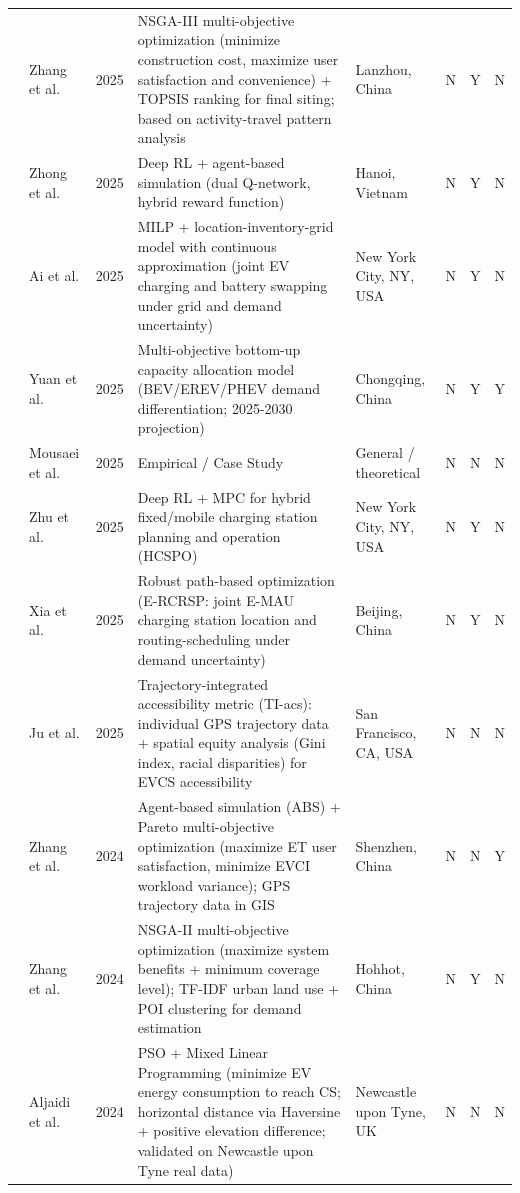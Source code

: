\documentclass[letterpaper, 12pt, oneside, doublespacing]{Thesis}
\begin{document}
\begin{longtable}{L{0.9cm} L{1.8cm} L{0.7cm} L{2.5cm} L{2.1cm} L{0.7cm} L{0.7cm} L{0.7cm}}
\cite{optimization_of_2025} & Zhang et al. & 2025 & NSGA-III multi-objective optimization (minimize construction cost, maximize user satisfaction and convenience) + TOPSIS ranking for final siting; based on activity-travel pattern analysis & Lanzhou, China & N & Y & N \\
\cite{optimizing_electric_2025} & Zhong et al. & 2025 & Deep RL + agent-based simulation (dual Q-network, hybrid reward function) & Hanoi, Vietnam & N & Y & N \\
\cite{optimizing_urban_2025} & Ai et al. & 2025 & MILP + location-inventory-grid model with continuous approximation (joint EV charging and battery swapping under grid and demand uncertainty) & New York City, NY, USA & N & Y & N \\
\cite{planning_future_2025} & Yuan et al. & 2025 & Multi-objective bottom-up capacity allocation model (BEV/EREV/PHEV demand differentiation; 2025-2030 projection) & Chongqing, China & N & Y & Y \\
\cite{predicting_optimal_2025} & Mousaei et al. & 2025 & Empirical / Case Study & General {\slash} theoretical & N & N & N \\
\cite{reinforcement_learning_2025} & Zhu et al. & 2025 & Deep RL + MPC for hybrid fixed/mobile charging station planning and operation (HCSPO) & New York City, NY, USA & N & Y & N \\
\cite{robust_charging_2025} & Xia et al. & 2025 & Robust path-based optimization (E-RCRSP: joint E-MAU charging station location and routing-scheduling under demand uncertainty) & Beijing, China & N & Y & N \\
\cite{trajectory-integrated_accessibility_2025} & Ju et al. & 2025 & Trajectory-integrated accessibility metric (TI-acs): individual GPS trajectory data + spatial equity analysis (Gini index, racial disparities) for EVCS accessibility & San Francisco, CA, USA & N & N & N \\
\cite{a_data-driven_2024} & Zhang et al. & 2024 & Agent-based simulation (ABS) + Pareto multi-objective optimization (maximize ET user satisfaction, minimize EVCI workload variance); GPS trajectory data in GIS & Shenzhen, China & N & N & Y \\
\cite{a_multi-objective_2024} & Zhang et al. & 2024 & NSGA-II multi-objective optimization (maximize system benefits + minimum coverage level); TF-IDF urban land use + POI clustering for demand estimation & Hohhot, China & N & Y & N \\
\cite{a_particle_2024} & Aljaidi et al. & 2024 & PSO + Mixed Linear Programming (minimize EV energy consumption to reach CS; horizontal distance via Haversine + positive elevation difference; validated on Newcastle upon Tyne real data) & Newcastle upon Tyne, UK & N & N & N \\

\end{longtable}
\end{document}
